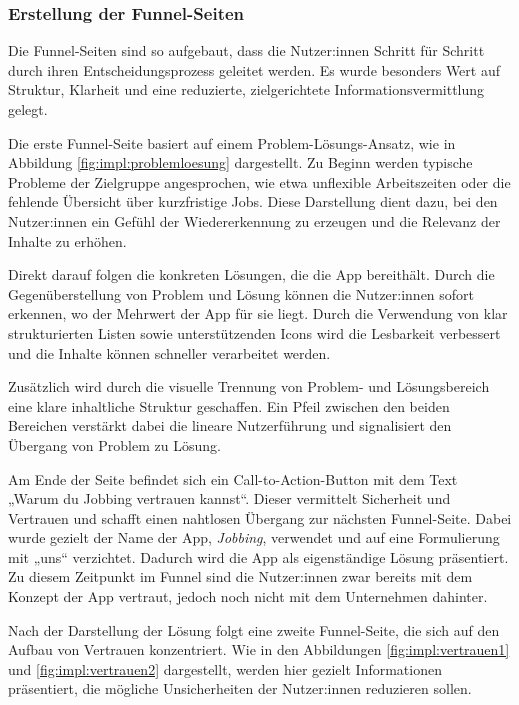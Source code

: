 \subsubsection{Erstellung der Funnel-Seiten}

Die Funnel-Seiten sind so aufgebaut, dass die Nutzer:innen 
Schritt für Schritt durch ihren Entscheidungsprozess geleitet werden. 
Es wurde besonders Wert auf Struktur, Klarheit und eine reduzierte, 
zielgerichtete Informationsvermittlung gelegt.

Die erste Funnel-Seite basiert auf einem Problem-Lösungs-Ansatz, wie in 
Abbildung \ref{fig:impl:problemloesung} dargestellt. Zu Beginn werden typische 
Probleme der Zielgruppe angesprochen, wie etwa unflexible Arbeitszeiten oder die 
fehlende Übersicht über kurzfristige Jobs. Diese Darstellung dient dazu, 
bei den Nutzer:innen ein Gefühl der Wiedererkennung zu erzeugen und die 
Relevanz der Inhalte zu erhöhen.

Direkt darauf folgen die konkreten Lösungen, die die App bereithält. 
Durch die Gegenüberstellung von Problem und Lösung können die Nutzer:innen 
sofort erkennen, wo der Mehrwert der App für sie liegt.
Durch die Verwendung von klar strukturierten Listen sowie unterstützenden Icons wird 
die Lesbarkeit verbessert und die Inhalte können schneller verarbeitet werden.

Zusätzlich wird durch die visuelle Trennung von Problem- und Lösungsbereich 
eine klare inhaltliche Struktur geschaffen. Ein Pfeil zwischen den beiden 
Bereichen verstärkt dabei die lineare Nutzerführung und signalisiert den 
Übergang von Problem zu Lösung.

Am Ende der Seite befindet sich ein Call-to-Action-Button mit dem Text 
„Warum du Jobbing vertrauen kannst“. Dieser vermittelt Sicherheit und 
Vertrauen und schafft einen nahtlosen Übergang zur nächsten Funnel-Seite.
Dabei wurde gezielt der Name der App, \textit{Jobbing}, verwendet und auf eine 
Formulierung mit „uns“ verzichtet. Dadurch wird die App als eigenständige 
Lösung präsentiert. Zu diesem Zeitpunkt im Funnel sind die Nutzer:innen 
zwar bereits mit dem Konzept der App vertraut, jedoch noch nicht mit dem 
Unternehmen dahinter.

Nach der Darstellung der Lösung folgt eine zweite Funnel-Seite, die sich 
auf den Aufbau von Vertrauen konzentriert. Wie in den Abbildungen 
\ref{fig:impl:vertrauen1} und \ref{fig:impl:vertrauen2} dargestellt, werden 
hier gezielt Informationen präsentiert, die mögliche Unsicherheiten der 
Nutzer:innen reduzieren sollen.

